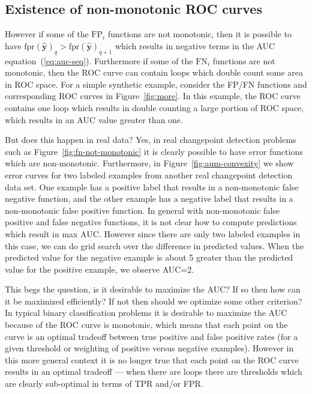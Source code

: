 \documentclass{article}
\begin{document}
\subsection{Existence of non-monotonic ROC curves}

However if some of the $\text{FP}_i$ functions are not monotonic, then it is possible to have $\text{fpr}(\mathbf {\hat y})_{q} > \text{fpr}(\mathbf {\hat y})_{q+1}$ which results in negative terms in the AUC equation~(\ref{eq:auc-seq}). 
Furthermore if some of the $\text{FN}_i$ functions are not monotonic, then the ROC curve can contain loops which double count some area in ROC space.
For a simple synthetic example, consider the FP/FN functions and corresponding ROC curves in Figure~\ref{fig:more}.
In this example, the ROC curve contains one loop which results in double counting a large portion of ROC space, which results in an AUC value greater than one.


But does this happen in real data? Yes, in real changepoint detection problems such as Figure~\ref{fig:fn-not-monotonic} it is clearly possible to have error functions which are non-monotonic.
Furthermore, in Figure~\ref{fig:aum-convexity} we show error curves for two labeled examples from another real changepoint detection data set.
One example has a positive label that results in a non-monotonic false negative function, and the other example has a negative label that results in a non-monotonic false positive function.
In general with non-monotonic false positive and false negative functions, it is not clear how to compute predictions which result in max AUC.
However since there are only two labeled examples in this case, we can do grid search over the difference in predicted values.
When the predicted value for the negative example is about 5 greater than the predicted value for the positive example, we observe AUC=2.

This begs the question, is it desirable to maximize the AUC? If so then how can it be maximized efficiently? If not then should we optimize some other criterion?
In typical binary classification problems it is desirable to maximize the AUC because of the ROC curve is monotonic, which means that each point on the curve is an optimal tradeoff between true positive and false positive rates (for a given threshold or weighting of positive versus negative examples).
However in this more general context it is no longer true that each point on the ROC curve results in an optimal tradeoff --- when there are loops there are thresholds which are clearly sub-optimal in terms of TPR and/or FPR.
\end{document}

